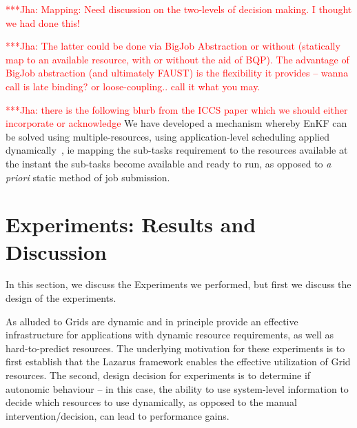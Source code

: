 \documentclass[conference,final]{IEEEtran}
\newcommand{\jhanote}[1]{ {\textcolor{red} { ***Jha: #1 }}}
\newcommand{\jhanote}[1]{}
\begin{document}
\jhanote{Mapping: Need discussion on the two-levels of decision
  making. I thought we had done this!}

\jhanote{The latter could be done via BigJob Abstraction or without
  (statically map to an available resource, with or without the aid of
  BQP).  The advantage of BigJob abstraction (and ultimately FAUST) is
  the flexibility it provides -- wanna call is late binding? or
  loose-coupling..  call it what you may.}

\jhanote{there is the following blurb from the ICCS paper which we
  should either incorporate or acknowledge} We have developed a
mechanism whereby EnKF can be solved using multiple-resources, using
application-level scheduling applied dynamically~\cite{saga_tg08}, ie
mapping the sub-tasks requirement to the resources available at the
instant the sub-tasks become available and ready to run, as opposed to
{\it a priori} static method of job submission.  



\section{Experiments: Results and Discussion}

In this section, we discuss the Experiments we performed, but first
we discuss the design of the experiments.

As alluded to Grids are dynamic and in principle provide an effective
infrastructure for applications with dynamic resource requirements, as
well as hard-to-predict resources. The underlying motivation for these
experiments is to first establish that the Lazarus framework enables
the effective utilization of Grid resources. The second, design
decision for experiments is to determine if autonomic behaviour -- in
this case, the ability to use system-level information to decide which
resources to use dynamically, as opposed to the manual
intervention/decision, can lead to performance gains.
\end{document}
